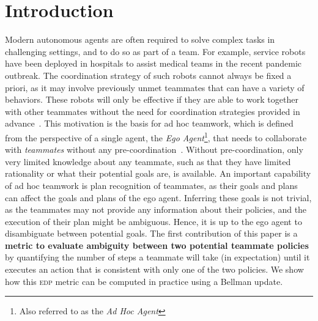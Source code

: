 \documentclass[letterpaper]{article}
\begin{document}
\section{Introduction}
Modern autonomous agents are often required to solve complex tasks in challenging settings, and to do so as part of a team. For example, service robots have been deployed in hospitals to assist medical teams in the recent pandemic outbreak. The coordination strategy of such robots cannot always be fixed a priori, as it may involve previously unmet teammates that can have a variety of behaviors. %
These robots will only be effective if they are able to work together with other teammates without the need for coordination strategies provided in advance~\cite{cakmak2012designing}.
This motivation is the basis for ad hoc teamwork, which is defined from the perspective of a single agent, the \emph{Ego Agent}\footnote{Also referred to as the \emph{Ad Hoc Agent}}, that needs to collaborate with \emph{teammates} without any pre-coordination~\cite{stone2010ad,albrecht2018autonomous}. Without pre-coordination, only very limited knowledge about any teammate, such as that they have limited rationality or what their potential goals are, is available.
An important capability of ad hoc teamwork is plan recognition of teammates, as their goals and plans can affect the goals and plans of the ego agent.
Inferring these goals is not trivial, as the teammates may not provide any information about their policies, and the execution of their plan might be ambiguous. Hence, it is up to the ego agent to disambiguate between potential goals.
The first contribution of this paper is a \textbf{metric to evaluate ambiguity between two potential teammate policies} by quantifying the number of steps a teammate will take (in expectation) until it executes an action that is consistent with only one of the two policies.
We show how this \textsc{edp} metric can be computed in practice using a Bellman update.
\end{document}
